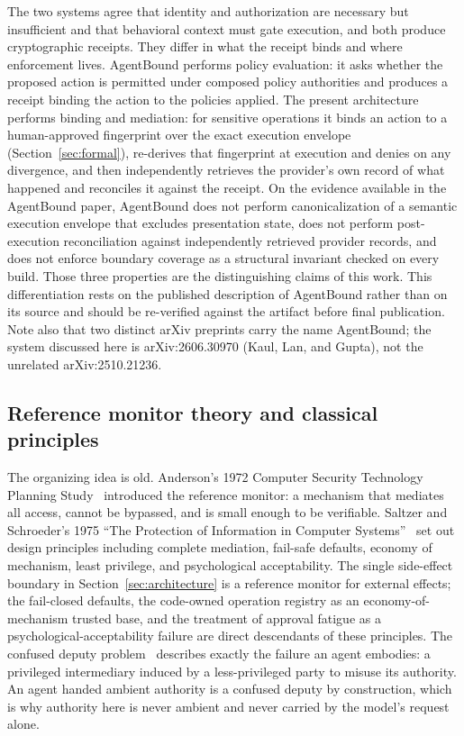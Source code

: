 \documentclass[11pt,letterpaper]{article}
\begin{document}
The two systems agree that identity and authorization are necessary but insufficient and that behavioral context must gate execution, and both produce cryptographic receipts. They differ in what the receipt binds and where enforcement lives. AgentBound performs policy evaluation: it asks whether the proposed action is permitted under composed policy authorities and produces a receipt binding the action to the policies applied. The present architecture performs binding and mediation: for sensitive operations it binds an action to a human-approved fingerprint over the exact execution envelope (Section~\ref{sec:formal}), re-derives that fingerprint at execution and denies on any divergence, and then independently retrieves the provider's own record of what happened and reconciles it against the receipt. On the evidence available in the AgentBound paper, AgentBound does not perform canonicalization of a semantic execution envelope that excludes presentation state, does not perform post-execution reconciliation against independently retrieved provider records, and does not enforce boundary coverage as a structural invariant checked on every build. Those three properties are the distinguishing claims of this work. This differentiation rests on the published description of AgentBound rather than on its source and should be re-verified against the artifact before final publication. Note also that two distinct arXiv preprints carry the name AgentBound; the system discussed here is arXiv:2606.30970 (Kaul, Lan, and Gupta), not the unrelated arXiv:2510.21236.

\subsection{Reference monitor theory and classical principles}\label{sec:related-classical}

The organizing idea is old. Anderson's 1972 Computer Security Technology Planning Study~\cite{anderson1972} introduced the reference monitor: a mechanism that mediates all access, cannot be bypassed, and is small enough to be verifiable. Saltzer and Schroeder's 1975 ``The Protection of Information in Computer Systems''~\cite{saltzer1975} set out design principles including complete mediation, fail-safe defaults, economy of mechanism, least privilege, and psychological acceptability. The single side-effect boundary in Section~\ref{sec:architecture} is a reference monitor for external effects; the fail-closed defaults, the code-owned operation registry as an economy-of-mechanism trusted base, and the treatment of approval fatigue as a psychological-acceptability failure are direct descendants of these principles. The confused deputy problem~\cite{hardy1988} describes exactly the failure an agent embodies: a privileged intermediary induced by a less-privileged party to misuse its authority. An agent handed ambient authority is a confused deputy by construction, which is why authority here is never ambient and never carried by the model's request alone.
\end{document}
